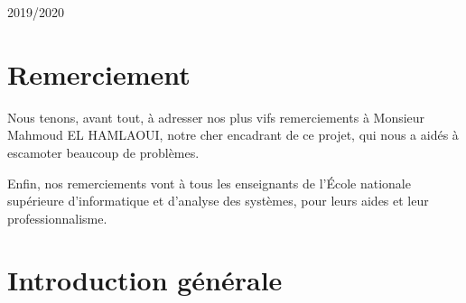 \documentclass[11.5pt]{report}
\begin{document}
\begin{titlepage}
	\begin{center}
		\vspace{1cm}
		2019/2020
	\end{center}

\end{titlepage}
\leavevmode\thispagestyle{empty}\newpage
\chapter*{Remerciement}
\large
\begin{onehalfspace}
	 Nous tenons, avant tout, à adresser nos plus vifs remerciements à Monsieur Mahmoud EL HAMLAOUI, notre cher encadrant de ce projet, qui nous a aidés à escamoter beaucoup de problèmes.
	 
	 Enfin, nos remerciements vont à tous les enseignants de l’École nationale supérieure d'informatique et d'analyse des systèmes, pour leurs aides et leur professionnalisme.
\end{onehalfspace}
\thispagestyle{empty}
\newpage

\listoffigures
\listoftables
\thispagestyle{empty}
\renewcommand{\contentsname}{Sommaire} 
\tableofcontents
\thispagestyle{empty}
\newpage


\chapter*{Introduction générale}
\end{document}
